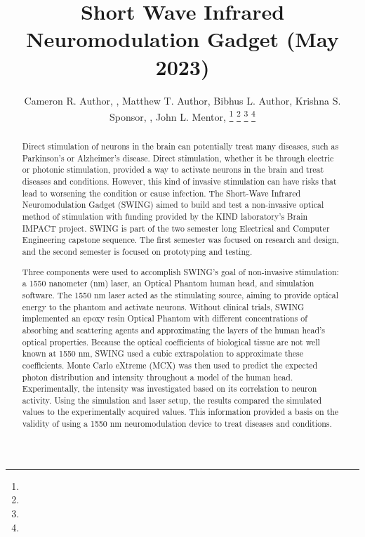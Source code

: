 \documentclass[journal,twoside,web]{ieeecolor}
\begin{document}
\title{Short Wave Infrared Neuromodulation Gadget (May 2023)}
\author{Cameron R. Author, , Matthew T. Author, Bibhus L. Author, 
        Krishna S. Sponsor, , John L. Mentor, 
\thanks{ }
\thanks{ }
\thanks{ }
\thanks{ }}

\maketitle

\begin{abstract}
Direct stimulation of neurons in the brain can potentially treat many diseases, such as Parkinson's 
or Alzheimer's disease. Direct stimulation, whether it be through electric or photonic stimulation, 
provided a way to activate neurons in the brain and treat diseases and conditions. However, this kind 
of invasive stimulation can have risks that lead to worsening the condition or cause infection. 
The Short-Wave Infrared Neuromodulation Gadget (SWING) aimed to build and test a non-invasive optical method 
of stimulation with funding provided by the KIND laboratory's Brain IMPACT project. SWING is part of the 
two semester long Electrical and Computer Engineering capstone sequence. The first semester was focused on research 
and design, and the second semester is focused on prototyping and testing.

Three components were used to accomplish SWING's goal of non-invasive stimulation: a 1550 nanometer (nm) laser, 
an Optical Phantom human head, and simulation software. The 1550 nm laser acted as the stimulating source, 
aiming to provide optical energy to the phantom and activate neurons. Without clinical trials, SWING implemented an epoxy resin 
Optical Phantom with different concentrations of absorbing and scattering agents and approximating the layers of the human head's 
optical properties. Because the optical coefficients of biological tissue are not well known at 1550 nm, 
SWING used a cubic extrapolation to approximate these coefficients. Monte Carlo eXtreme (MCX) was then used to predict the 
expected photon distribution and intensity throughout a model of the human head. Experimentally, the intensity was investigated 
based on its correlation to neuron activity. Using the simulation and laser setup, the results compared the simulated values to the 
experimentally acquired values. This information provided a basis on the validity of using a 1550 nm neuromodulation device to treat 
diseases and conditions.
\end{abstract}
\end{document}
